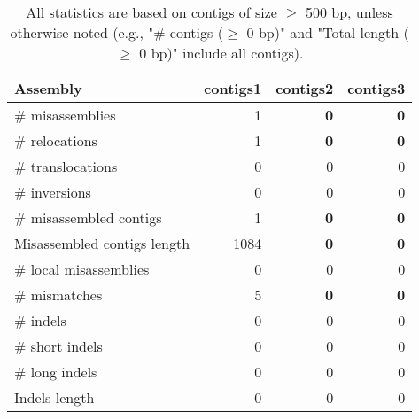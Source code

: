\documentclass[12pt,a4paper]{article}
\begin{document}
\begin{table}[ht]
\begin{center}
\caption{All statistics are based on contigs of size $\geq$ 500 bp, unless otherwise noted (e.g., "\# contigs ($\geq$ 0 bp)" and "Total length ($\geq$ 0 bp)" include all contigs).}
\begin{tabular}{|l*{3}{|r}|}
\hline
Assembly & contigs1 & contigs2 & contigs3 \\ \hline
\# misassemblies & 1 & {\bf 0} & {\bf 0} \\ \hline
\hspace{5mm}\# relocations & 1 & {\bf 0} & {\bf 0} \\ \hline
\hspace{5mm}\# translocations & 0 & 0 & 0 \\ \hline
\hspace{5mm}\# inversions & 0 & 0 & 0 \\ \hline
\# misassembled contigs & 1 & {\bf 0} & {\bf 0} \\ \hline
Misassembled contigs length & 1084 & {\bf 0} & {\bf 0} \\ \hline
\# local misassemblies & 0 & 0 & 0 \\ \hline
\# mismatches & 5 & {\bf 0} & {\bf 0} \\ \hline
\# indels & 0 & 0 & 0 \\ \hline
\hspace{5mm}\# short indels & 0 & 0 & 0 \\ \hline
\hspace{5mm}\# long indels & 0 & 0 & 0 \\ \hline
Indels length & 0 & 0 & 0 \\ \hline
\end{tabular}
\end{center}
\end{table}
\end{document}

